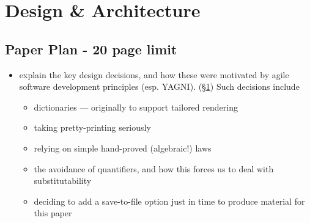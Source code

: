 \section{Design \& Architecture}\label{sec:Design}

\subsection*{Paper Plan - 20 page limit}

\begin{itemize}
  \item
     explain the key design decisions,
     and how these were motivated by agile software development
     principles (esp. YAGNI). (\S\ref{sec:Design})
     Such decisions include
     \begin{itemize}
       \item dictionaries --- originally to support tailored rendering
       \item taking pretty-printing seriously
       \item relying on simple hand-proved (algebraic!) laws
       \item the avoidance of quantifiers,
        and how this forces us to deal with substitutability
       \item deciding to add a save-to-file option
        just in time to produce material for this paper
     \end{itemize}
\end{itemize}
